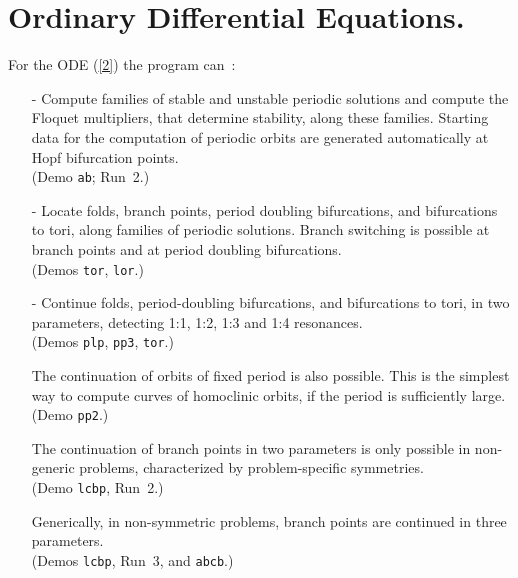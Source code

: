 \documentclass[12pt]{report}
\begin{document}
\section{ Ordinary Differential Equations.} \label{sec:ODEs}
For the ODE (\ref{2}) the program can~:~
 
\begin{itemize}
\item[-]
  Compute families of stable and unstable periodic
  solutions and
  compute the Floquet multipliers, that determine stability, along
  these families.
  Starting data for the computation of periodic orbits are
  generated automatically at Hopf bifurcation points. \\
  (Demo {\tt ab}; Run~2.)
\item[-]
  Locate folds, branch points, period doubling bifurcations,
  and bifurcations to tori, along families of periodic solutions. 
  Branch switching is possible at branch points and at period 
  doubling bifurcations.  \\
  (Demos {\tt tor}, {\tt lor}.)
\item[-]  Continue folds, period-doubling bifurcations,
  and bifurcations to tori, in two parameters, detecting
  1:1, 1:2, 1:3 and 1:4 resonances. \\
  (Demos {\tt plp}, {\tt pp3}, {\tt tor}.)

  The continuation of orbits of fixed period is also
  possible. This is the simplest way to compute curves of
  homoclinic orbits, if the period is sufficiently large. \\
  (Demo {\tt pp2}.)

  The continuation of branch points in two parameters is only possible
  in non-generic problems, characterized by problem-specific symmetries.\\
  (Demo {\tt lcbp}, Run~2.)

  Generically, in non-symmetric problems, branch points are continued
  in three parameters.\\
  (Demos {\tt lcbp}, Run~3, and {\tt abcb}.)


\end{itemize}
\end{document}
